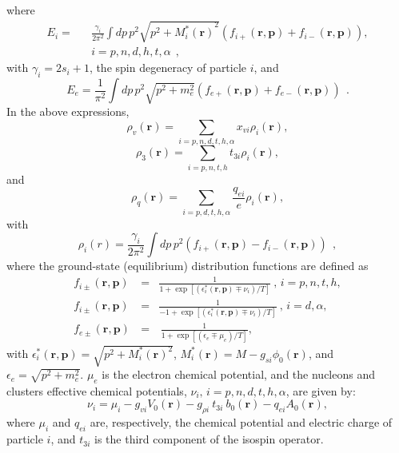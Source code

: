 \documentclass[aps,prc,nofootinbib,twocolumn,showpacs]{revtex4-1}
\begin{document}
where 
\begin{eqnarray}
E_i=&&\frac{\gamma_i}{2\pi^2}\int dp\, p^2
  \sqrt{p^2+{M_i^{*}(\mathbf r)}^2}\left(f_{i+}(\mathbf r, \mathbf
  p)+f_{i-}(\mathbf r, \mathbf p)\right) ,\nonumber\\
&&i=p,n,d,h,t,\alpha~~, 
\end{eqnarray}
with $\gamma_i=2s_i+1$, the spin degeneracy of particle $i$, and 
\begin{equation}
E_e=\frac{1}{\pi^2}\int dp\, p^2 \sqrt{p^2+m_e^2}\left(f_{e+}(\mathbf r, \mathbf p)+f_{e-}(\mathbf r, \mathbf p)\right) ~~.
\end{equation}
In the above expressions,
\begin{equation}
\rho_v{(\mathbf r)}= \sum_{i=p,n,d,t,h,\alpha} {x_{vi}} \rho_i(\mathbf r),
\end{equation}
\begin{equation}
\rho_3{(\mathbf r)}= \sum_{i=p,n,t,h} t_{3i}\rho_i(\mathbf r),
\end{equation}
and
\begin{equation}
\rho_q{(\mathbf r)}= \sum_{i=p,d,t,h,\alpha} \frac{q_{ei}}{e}\rho_i(\mathbf r),
\end{equation}
with
\begin{equation}
\rho_i(r)=\frac{\gamma_i}{2\pi^2}\int dp\, p^2 \left(f_{i+}(\mathbf r, \mathbf p)-f_{i-}(\mathbf r, \mathbf p)\right) ~~,
\end{equation}
where the  ground-state (equilibrium) distribution functions are defined as 
\begin{eqnarray}
f_{i\pm}(\mathbf r, \mathbf p)&=&\frac{1}{1+\exp
\left[{(\epsilon_i^*(\mathbf r, \mathbf p)\mp \nu_i)/T}\right] }~
,\, i=p,n, t,h, \nonumber\\
f_{i\pm}(\mathbf r, \mathbf p)&=&\frac{1}{-1+\exp
\left[{(\epsilon_i^*(\mathbf r, \mathbf p)\mp \nu_i)/T}\right] }~
,\, i=d,\alpha, \nonumber\\
f_{e\pm}({\mathbf r},{\mathbf p})\,&=&\,\frac{1}{1+\exp[(\epsilon_e\mp
\mu_e)/T]},
\label{dist}
\end{eqnarray}
with $\epsilon_i^*(\mathbf r, \mathbf p)=\sqrt{p^2+M_i^*(\mathbf r)^2}$,
$M_i^* (\mathbf r) = M- {g_{si}}\phi_0 (\mathbf r)$, and $\epsilon_e=\sqrt{p^2+m_e^2}$.
 $\mu_e$ is the electron chemical potential, and
the nucleons and clusters effective chemical potentials, $\nu_i,\, i=p,n,d,t,h,\alpha$, are given by:
\begin{equation}
\nu_i=\mu_i - g_{vi} V_0 (\mathbf r)- {g_{\rho i}}~  t_{3 i}~ b_0 (\mathbf r)-
q_{ei} A_0(\mathbf r),
\end{equation}
where $\mu_i$ and $q_{ei}$ are, respectively, the chemical potential and electric charge of particle $i$, and $t_{3i}$ is the third component of the isospin operator.
\end{document}
